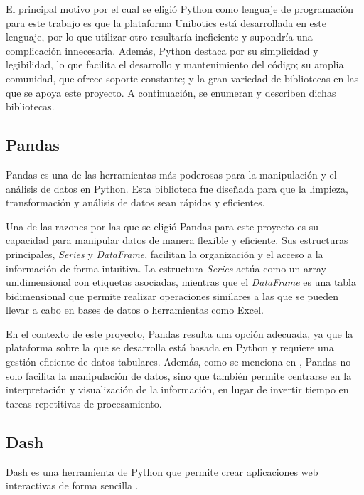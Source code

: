 \documentclass[a4paper, 12pt]{book}
\begin{document}
El principal motivo por el cual se eligió Python como lenguaje de programación para este trabajo es que la plataforma Unibotics está desarrollada en este lenguaje, por lo que utilizar otro resultaría ineficiente y supondría una complicación innecesaria. Además, Python destaca por su simplicidad y legibilidad, lo que facilita el desarrollo y mantenimiento del código; su amplia comunidad, que ofrece soporte constante; y la gran variedad de bibliotecas en las que se apoya este proyecto. A continuación, se enumeran y describen dichas bibliotecas.

\subsection{Pandas}
\label{subsec:Pandas}

Pandas es una de las herramientas más poderosas para la manipulación y el análisis de datos en Python. Esta biblioteca fue diseñada para que la limpieza, transformación y análisis de datos sean rápidos y eficientes.

Una de las razones por las que se eligió Pandas para este proyecto es su capacidad para manipular datos de manera flexible y eficiente. Sus estructuras principales, \textit{Series} y \textit{DataFrame}, facilitan la organización y el acceso a la información de forma intuitiva. La estructura \textit{Series} actúa como un array unidimensional con etiquetas asociadas, mientras que el \textit{DataFrame} es una tabla bidimensional que permite realizar operaciones similares a las que se pueden llevar a cabo en bases de datos o herramientas como Excel.

En el contexto de este proyecto, Pandas resulta una opción adecuada, ya que la plataforma sobre la que se desarrolla está basada en Python y requiere una gestión eficiente de datos tabulares. Además, como se menciona en \cite{mckinney2022python}, Pandas no solo facilita la manipulación de datos, sino que también permite centrarse en la interpretación y visualización de la información, en lugar de invertir tiempo en tareas repetitivas de procesamiento.

\subsection{Dash}
\label{subsec:dash}

Dash es una herramienta de Python que permite crear aplicaciones web interactivas de forma sencilla \cite{schroeder2022book,dashPlotlyDocumentation}.
\end{document}
